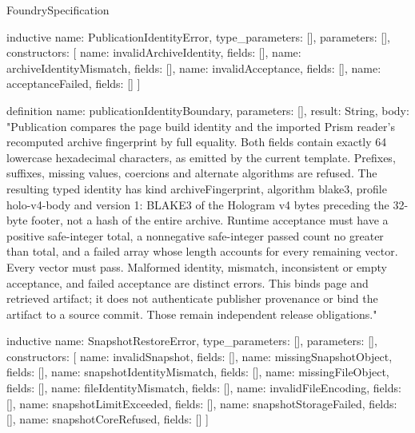 \begin{lexlean}{FoundrySpecification}
\begin{semanticmodule}
inductive{
  name: PublicationIdentityError,
  type_parameters: [],
  parameters: [],
  constructors: [
    {name: invalidArchiveIdentity, fields: []},
    {name: archiveIdentityMismatch, fields: []},
    {name: invalidAcceptance, fields: []},
    {name: acceptanceFailed, fields: []}
  ]
}

definition{
  name: publicationIdentityBoundary,
  parameters: [],
  result: String,
  body: "Publication compares the page build identity and the imported Prism reader's recomputed archive fingerprint by full equality. Both fields contain exactly 64 lowercase hexadecimal characters, as emitted by the current template. Prefixes, suffixes, missing values, coercions and alternate algorithms are refused. The resulting typed identity has kind archiveFingerprint, algorithm blake3, profile holo-v4-body and version 1: BLAKE3 of the Hologram v4 bytes preceding the 32-byte footer, not a hash of the entire archive. Runtime acceptance must have a positive safe-integer total, a nonnegative safe-integer passed count no greater than total, and a failed array whose length accounts for every remaining vector. Every vector must pass. Malformed identity, mismatch, inconsistent or empty acceptance, and failed acceptance are distinct errors. This binds page and retrieved artifact; it does not authenticate publisher provenance or bind the artifact to a source commit. Those remain independent release obligations."
}

inductive{
  name: SnapshotRestoreError,
  type_parameters: [],
  parameters: [],
  constructors: [
    {name: invalidSnapshot, fields: []},
    {name: missingSnapshotObject, fields: []},
    {name: snapshotIdentityMismatch, fields: []},
    {name: missingFileObject, fields: []},
    {name: fileIdentityMismatch, fields: []},
    {name: invalidFileEncoding, fields: []},
    {name: snapshotLimitExceeded, fields: []},
    {name: snapshotStorageFailed, fields: []},
    {name: snapshotCoreRefused, fields: []}
  ]
}


\end{semanticmodule}
\end{lexlean}
